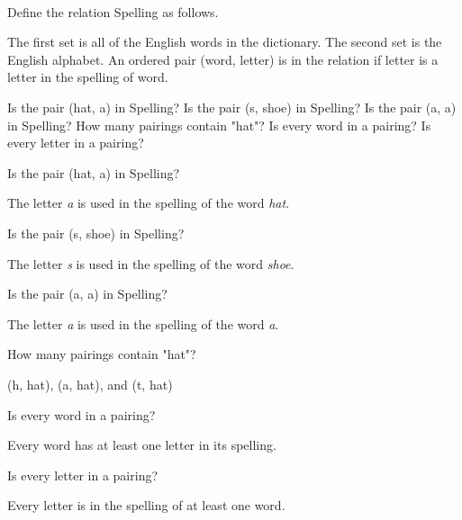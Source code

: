 \documentclass{ximera}
\begin{document}
\begin{exercise}
\quad \\
Define the relation Spelling as follows.

The first set is all of the English words in the dictionary. The second set is the English alphabet. An ordered pair (word, letter) is in the relation if letter is a letter in the spelling of word.

Is the pair (hat, a) in Spelling?
Is the pair (s, shoe) in Spelling?
Is the pair (a, a) in Spelling?
How many pairings contain "hat"?
Is every word in a pairing?
Is every letter in a pairing?


\begin{problem} Is the pair (hat, a) in Spelling? 
\begin{feedback}
The letter \textit{a} is used in the spelling of the word \textit{hat}.
\end{feedback}
\end{problem}


\begin{problem} Is the pair (s, shoe) in Spelling? 
\begin{feedback}
The letter \textit{s} is used in the spelling of the word \textit{shoe}.
\end{feedback}
\end{problem}


\begin{problem} Is the pair (a, a) in Spelling? 
\begin{feedback}
The letter \textit{a} is used in the spelling of the word \textit{a}.
\end{feedback}
\end{problem}


\begin{problem} How many pairings contain "hat"? 
\begin{feedback}
(h, hat), (a, hat), and (t, hat)
\end{feedback}
\end{problem}


\begin{problem} Is every word in a pairing? 
\begin{feedback}
Every word has at least one letter in its spelling.
\end{feedback}
\end{problem}


\begin{problem} Is every letter in a pairing? 
\begin{feedback}
Every letter is in the spelling of at least one word.
\end{feedback}
\end{problem}




\end{exercise}
\end{document}
